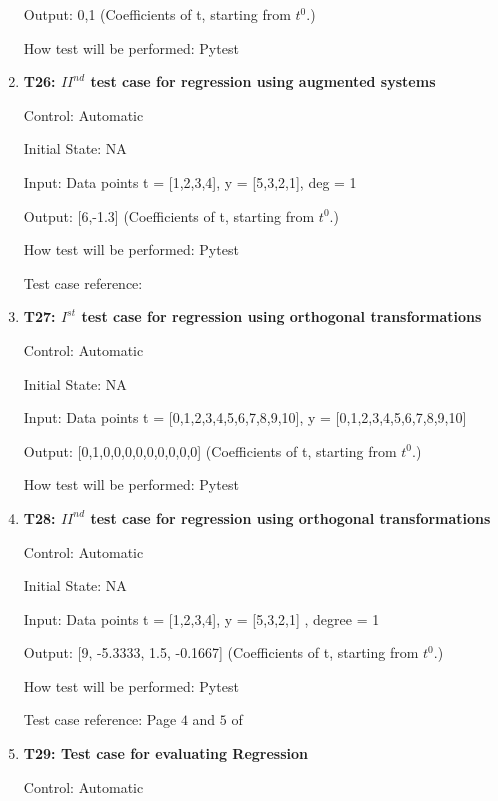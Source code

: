 \documentclass[12pt, titlepage]{article}
\begin{document}
\begin{enumerate}
Output: 0,1 (Coefficients of t, starting from $t^{0}$.)

How test will be performed: Pytest\\

\item{\textbf{T26: ${II}^{nd}$ test case for regression using augmented 
systems}\\}

Control: Automatic

Initial State: NA

Input: Data points t = [1,2,3,4], y = [5,3,2,1], deg = 1

Output: [6,-1.3] (Coefficients of t, starting from $t^{0}$.)

How test will be performed: Pytest

Test case reference: \cite{RegAugmented}\\


\item{\textbf{T27: ${I}^{st}$ test case for regression using orthogonal 
transformations}\\}

Control: Automatic

Initial State: NA

Input: Data points t = [0,1,2,3,4,5,6,7,8,9,10], y = [0,1,2,3,4,5,6,7,8,9,10] 

Output: [0,1,0,0,0,0,0,0,0,0,0] (Coefficients of t, starting from $t^{0}$.)

How test will be performed: Pytest\\


\item{\textbf{T28: ${II}^{nd}$ test case for regression using orthogonal 
transformations}\\}

Control: Automatic

Initial State: NA

Input: Data points t = [1,2,3,4], y = [5,3,2,1] , degree = 1

Output: [9, -5.3333, 1.5, -0.1667] (Coefficients of t, starting from $t^{0}$.)

How test will be performed: Pytest

Test case reference: Page $4$ and $5$ of \cite{RegOrthogonal}\\

\item{\textbf{T29: Test case for evaluating Regression}}

Control: Automatic


\end{enumerate}
\end{document}
